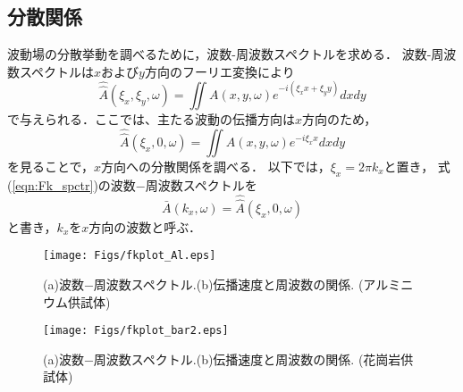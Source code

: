 \subsection{分散関係}
波動場の分散挙動を調べるために，波数-周波数スペクトルを求める．
波数-周波数スペクトルは$x$および$y$方向のフーリエ変換により
\begin{equation}
	\hat{\hat {A}}(\xi_x,\xi_y,\omega) =
	\iint A(x,y,\omega)e^{-i(\xi_x x +\xi_y y)}dxdy
	\label{eqn:Fkk_spctr}
\end{equation}
で与えられる．ここでは、主たる波動の伝播方向は$x$方向のため，
\begin{equation}
	\hat{\hat {A}}(\xi_x,0,\omega) =
	\iint A(x,y,\omega)e^{-i\xi_x x}dxdy
	\label{eqn:Fk_spctr}
\end{equation}
を見ることで，$x$方向への分散関係を調べる．
以下では，$\xi_x=2\pi k_x$と置き，
式(\ref{eqn:Fk_spctr})の波数−周波数スペクトルを
\begin{equation}
	\bar{A}(k_x,\omega)=\hat{\hat {A}}(\xi_x,0,\omega)
	\label{eqn:def_Ak}
\end{equation}
と書き，$k_x$を$x$方向の波数と呼ぶ．
\begin{figure}
\begin{center}
	\texttt{[image: Figs/fkplot\_Al.eps]}
	\caption{(a)波数−周波数スペクトル.(b)伝播速度と周波数の関係. (アルミニウム供試体)}
	\label{fig:}
\end{center}
\end{figure}
\begin{figure}
\begin{center}
	\texttt{[image: Figs/fkplot\_bar2.eps]}
	\caption{(a)波数−周波数スペクトル.(b)伝播速度と周波数の関係. (花崗岩供試体)}
	\label{fig:}
\end{center}
\end{figure}
